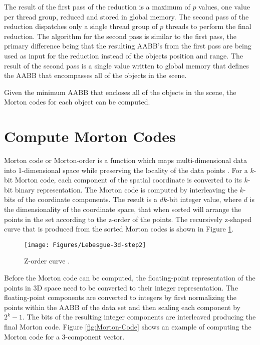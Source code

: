 The result of the first pass of the reduction is a maximum of $p$ values, one value per thread group, reduced and stored in global memory. The second pass of the reduction dispatches only a single thread group of $p$ threads to perform the final reduction. The algorithm for the second pass is similar to the first pass, the primary difference being that the resulting AABB's from the first pass are being used as input for the reduction instead of the objects position and range. The result of the second pass is a single value written to global memory that defines the AABB that encompasses all of the objects in the scene.

Given the minimum AABB that encloses all of the objects in the scene, the Morton codes for each object can be computed.

\section{Compute Morton Codes}

Morton code or Morton-order is a function which maps multi-dimensional data into 1-dimensional space while preserving the locality of the data points \parencite{30_morton_1966}. For a $k$-bit Morton code, each component of the spatial coordinate is converted to its $k$-bit binary representation. The Morton code is computed by interleaving the $k$-bits of the coordinate components. The result is a $dk$-bit integer value, where $d$ is the dimensionality of the coordinate space, that when sorted will arrange the points in the set according to the z-order of the points. The recursively z-shaped curve that is produced from the sorted Morton codes is shown in Figure \ref{fig:Z-order_curve}.

\begin{figure}[H]
\centering
\texttt{[image: Figures/Lebesgue-3d-step2]}
\decoRule
\caption{Z-order curve \parencite{31_dickau_2008}.}
\label{fig:Z-order_curve}
\end{figure}

Before the Morton code can be computed, the floating-point representation of the points in 3D space need to be converted to their integer representation. The floating-point components are converted to integers by first normalizing the points within the AABB of the data set and then scaling each component by $2^k-1$. The bits of the resulting integer components are interleaved producing the final Morton code. Figure \ref{fig:Morton-Code} shows an example of computing the Morton code for a 3-component vector.

